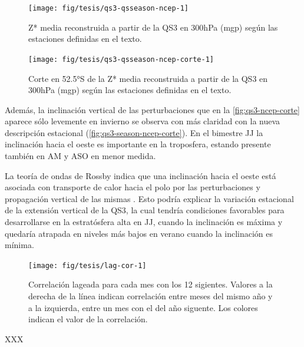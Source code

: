 \documentclass[spanish,a4paper,12pt,oneside]{book}
\begin{document}
\begin{figure}
\texttt{[image: fig/tesis/qs3-qsseason-ncep-1]} \caption{Z* media reconstruida a partir de la QS3 en 300hPa (mgp) según las estaciones definidas en el texto.}\label{fig:qs3-qsseason-ncep}
\end{figure}

\begin{figure}
\texttt{[image: fig/tesis/qs3-qsseason-ncep-corte-1]} \caption{Corte en 52.5°S de la Z* media reconstruida a partir de la QS3 en 300hPa (mgp) según las estaciones definidas en el texto.}\label{fig:qs3-qsseason-ncep-corte}
\end{figure}

Además, la inclinación vertical de las perturbaciones que en la
\autoref{fig:qs3-ncep-corte} aparece sólo levemente en invierno se
observa con más claridad con la nueva descripción estacional
(\autoref{fig:qs3-season-ncep-corte}). En el bimestre JJ la inclinación
hacia el oeste es importante en la troposfera, estando presente también
en AM y ASO en menor medida.

La teoría de ondas de Rossby indica que una inclinación hacia el oeste
está asociada con transporte de calor hacia el polo por las
perturbaciones y propagación vertical de las mismas \autocite{James}.
Esto podría explicar la variación estacional de la extensión vertical de
la QS3, la cual tendría condiciones favorables para desarrollarse en la
estratósfera alta en JJ, cuando la inclinación es máxima y quedaría
atrapada en niveles más bajos en verano cuando la inclinación es mínima.

\begin{figure}
\texttt{[image: fig/tesis/lag-cor-1]} \caption{Correlación lageada para cada mes con los 12 sigientes. Valores a la derecha de la línea indican correlación entre meses del mismo año y a la izquierda, entre un mes con el del año siguente. Los colores indican el valor de la correlación. }\label{fig:lag-cor}
\end{figure}

XXX
\end{document}
